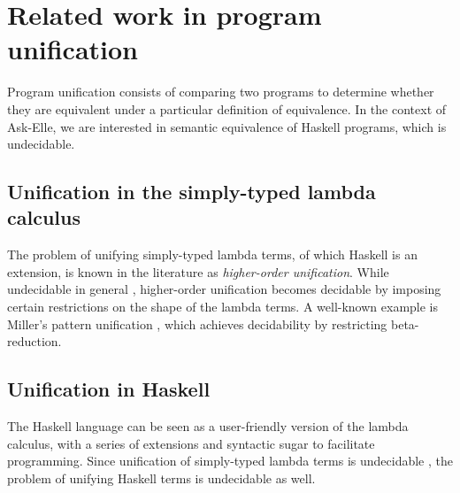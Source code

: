 





\section{Related work in program unification}
\label{sec:related-work-unification}

Program unification consists of comparing two programs to determine whether they are equivalent under a particular definition of equivalence. In the context of Ask-Elle, we are interested in semantic equivalence of Haskell programs, which is undecidable.

\subsection{Unification in the simply-typed lambda calculus}

The problem of unifying simply-typed lambda terms, of which Haskell is an extension, is known in the literature as \emph{higher-order unification}. While undecidable in general \cite{2013barendregt}, higher-order unification becomes decidable by imposing certain restrictions on the shape of the lambda terms. A well-known example is Miller's pattern unification \cite{1991miller}, which achieves decidability by restricting beta-reduction.

\subsection{Unification in Haskell}

The Haskell language can be seen as a user-friendly version of the lambda calculus, with a series of extensions and syntactic sugar to facilitate programming. Since unification of simply-typed lambda terms is undecidable \cite{2013barendregt}, the problem of unifying Haskell terms is undecidable as well.

